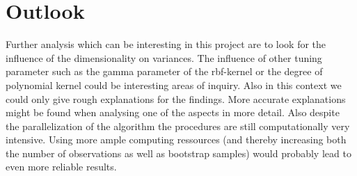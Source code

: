 \documentclass[a4paper]{article}
\begin{document}
\section{Outlook}

Further analysis which can be interesting in this project are to look for the influence of the dimensionality on variances. The influence of other tuning parameter such as the gamma parameter of the rbf-kernel or the degree of polynomial kernel could be interesting areas of inquiry. Also in this context we could only give rough explanations for the findings. More accurate explanations might be found when analysing one of the aspects in more detail. Also despite the parallelization of the algorithm the procedures are still computationally very intensive. Using more  ample computing ressources (and thereby increasing both the number of observations as well as bootstrap samples) would probably lead to even more reliable results.


\footnotesize


\end{document}
